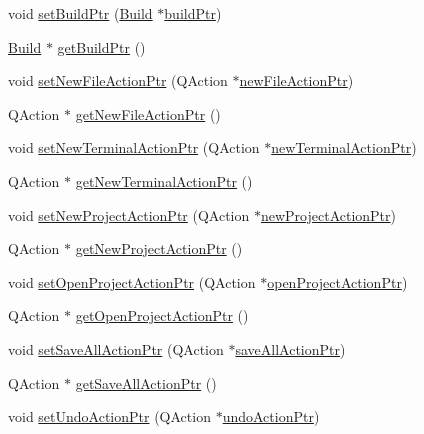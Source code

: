 \begin{DoxyCompactItemize}
void \hyperlink{class_master_actions_aad032f97113c45d9f02035b7e2ef605f}{set\-Build\-Ptr} (\hyperlink{class_build}{Build} $\ast$\hyperlink{class_master_actions_a204854f9bf284e221292497cdb7182ab}{build\-Ptr})
\item 
\hyperlink{class_build}{Build} $\ast$ \hyperlink{class_master_actions_aa1fb0f2857ad88742c874e22a308e4f4}{get\-Build\-Ptr} ()
\item 
void \hyperlink{class_master_actions_a4af05020cee8c5e80df586b03c20e765}{set\-New\-File\-Action\-Ptr} (Q\-Action $\ast$\hyperlink{class_master_actions_a4da658e527460b8d5b0a263820259e97}{new\-File\-Action\-Ptr})
\item 
Q\-Action $\ast$ \hyperlink{class_master_actions_a0ef76147044b06c8b951534a0d7ab7f2}{get\-New\-File\-Action\-Ptr} ()
\item 
void \hyperlink{class_master_actions_afe72189da4d2c5657f20d51fbcf6a62c}{set\-New\-Terminal\-Action\-Ptr} (Q\-Action $\ast$\hyperlink{class_master_actions_a6c3b1d9319fbf23f5a7cbe8305e16fc1}{new\-Terminal\-Action\-Ptr})
\item 
Q\-Action $\ast$ \hyperlink{class_master_actions_ae9f9f04302be1d7dc9fe902fc2597a1b}{get\-New\-Terminal\-Action\-Ptr} ()
\item 
void \hyperlink{class_master_actions_a4d6a5bfbd44ebe419d7cfa8295a54a39}{set\-New\-Project\-Action\-Ptr} (Q\-Action $\ast$\hyperlink{class_master_actions_a114ab55c27fc183af68ebaaa86748a82}{new\-Project\-Action\-Ptr})
\item 
Q\-Action $\ast$ \hyperlink{class_master_actions_a7065dfa244266181223b152795a996e9}{get\-New\-Project\-Action\-Ptr} ()
\item 
void \hyperlink{class_master_actions_abbbe38a813adedd51c5f7187c0d045a0}{set\-Open\-Project\-Action\-Ptr} (Q\-Action $\ast$\hyperlink{class_master_actions_a3b4d98cdbfaa8e287d420513a8df53ee}{open\-Project\-Action\-Ptr})
\item 
Q\-Action $\ast$ \hyperlink{class_master_actions_aac19d660169392d11b0ae1c2540cafb5}{get\-Open\-Project\-Action\-Ptr} ()
\item 
void \hyperlink{class_master_actions_a28b7a07a0c6932f5f8a55a778c1b2a0f}{set\-Save\-All\-Action\-Ptr} (Q\-Action $\ast$\hyperlink{class_master_actions_a4e9bf6410023b508d56f235903a44b5f}{save\-All\-Action\-Ptr})
\item 
Q\-Action $\ast$ \hyperlink{class_master_actions_afd7ef11ff065232fca47f971af02c5e5}{get\-Save\-All\-Action\-Ptr} ()
\item 
void \hyperlink{class_master_actions_ac1b4b1ac149aabb6530475503f715cd9}{set\-Undo\-Action\-Ptr} (Q\-Action $\ast$\hyperlink{class_master_actions_a23386959a2f60a89cc6ae1bff012c76c}{undo\-Action\-Ptr})

\end{DoxyCompactItemize}
